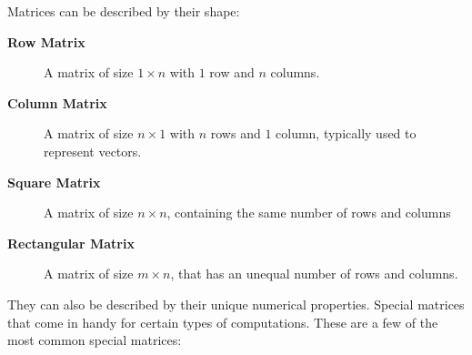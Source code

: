 Matrices can be described by their shape:
\begin{description}
    \item[\textbf{Row Matrix}] A matrix of size $1\times n$ with $1$ row and $n$ columns.
    \item[\textbf{Column Matrix}] A matrix of size $n\times 1$ with $n$ rows and $1$ column, typically used to represent vectors. 
    \item[\textbf{Square Matrix}] A matrix of size $n\times n$, containing the same number of rows and columns
    \item[\textbf{Rectangular Matrix}] A matrix of size $m \times n$, that has an unequal number of rows and columns.
    
\end{description}
They can also be described by their unique numerical properties. Special matrices that come in handy for certain types of computations. These are a few of the most common special matrices:
